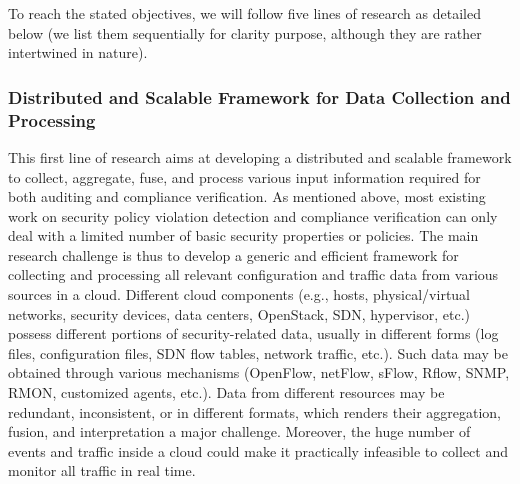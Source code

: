 \documentclass[12pt]{article}
\begin{document}
To reach the stated objectives, we will follow five lines of research
as detailed below (we list them sequentially for clarity purpose,
although they are rather intertwined in nature).


\vspace{-3mm}
\subsubsection{Distributed and Scalable Framework for Data Collection and Processing}
\label{subsec:5.1}
\vspace{-2mm}

This first line of research aims at developing a distributed and
scalable framework to collect, aggregate, fuse, and process various
input information required for both auditing and compliance
verification. As mentioned above, most existing work on security
policy violation detection and compliance verification can only deal
with a limited number of basic security properties or policies. The
main research challenge is thus to develop a generic and efficient
framework for collecting and processing all relevant configuration and
traffic data from various sources in a cloud. Different cloud
components (e.g., hosts, physical/virtual networks, security devices,
data centers, OpenStack, SDN, hypervisor, etc.)  possess different
portions of security-related data, usually in different forms (log
files, configuration files, SDN flow tables, network traffic,
etc.). Such data may be obtained through various mechanisms (OpenFlow,
netFlow, sFlow, Rflow, SNMP, RMON, customized agents, etc.). Data from
different resources may be redundant, inconsistent, or in different
formats, which renders their aggregation, fusion, and interpretation a
major challenge. Moreover, the huge number of events and traffic
inside a cloud could make it practically infeasible to collect and
monitor all traffic in real time.
\end{document}
